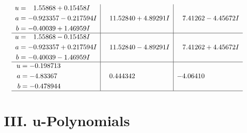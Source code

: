 \documentclass[1p]{elsarticle_modified}
\theoremstyle{definition}
\begin{document}
$$\begin{array}{c|c|c}
\begin{aligned}
u &= \phantom{-}1.55868 + 0.15458 I \\
a &= -0.923357 - 0.217594 I \\
b &= -0.40039 + 1.46959 I\end{aligned}
 & \phantom{-}11.52840 + 4.89291 I & \phantom{-}7.41262 - 4.45672 I \\ \hline\begin{aligned}
u &= \phantom{-}1.55868 - 0.15458 I \\
a &= -0.923357 + 0.217594 I \\
b &= -0.40039 - 1.46959 I\end{aligned}
 & \phantom{-}11.52840 - 4.89291 I & \phantom{-}7.41262 + 4.45672 I \\ \hline\begin{aligned}
u &= -0.198713\phantom{ +0.000000I} \\
a &= -4.83367\phantom{ +0.000000I} \\
b &= -0.478944\phantom{ +0.000000I}\end{aligned}
 & \phantom{-}0.444342\phantom{ +0.000000I} & -4.06410\phantom{ +0.000000I}\\
 \hline 
 \end{array}$$\newpage
\newpage\renewcommand{\arraystretch}{1}
\centering \section*{ III. u-Polynomials}
\end{document}
